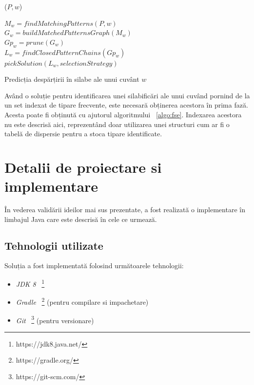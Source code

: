 \begin{algorithm}
\SetAlgoLined
{}

\ppg($P, w$) \\

$M_w = findMatchingPatterns(P,w)$ \\
$G_w = buildMatchedPatternsGraph(M_w)$ \\
$Gp_w = prune(G_w)$ \\
$L_w = findClosedPatternChains(Gp_w)$ \\
\KwRet $pickSolution(L_w, selectionStrategy)$
\vspace{1cm}

\caption{Predicția despărțirii în silabe ale unui cuvânt $w$}
\label{algo:rosil}
\end{algorithm}

Având o soluție pentru identificarea unei silabificări ale unui cuvând pornind de la un set indexat de tipare frecvente, este necesară obținerea acestora în prima fază. Acesta poate fi obținută cu ajutorul algoritmului ~\ref{algo:fse}. Indexarea acestora nu este descrisă aici, reprezentând doar utilizarea unei structuri cum ar fi o tabelă de dispersie pentru a stoca tipare identificate. 

\chapter{Detalii de proiectare si implementare}

În vederea validării ideilor mai sus prezentate, a fost realizată o implementare în limbajul Java care este descrisă în cele ce urmează.

\section{Tehnologii utilizate}

Soluția a fost implementată folosind următoarele tehnologii:

\begin{itemize}
	\item \textit{JDK 8} ~\footnote{https://jdk8.java.net/}
	\item \textit{Gradle} ~\footnote{https://gradle.org/} (pentru compilare si impachetare)
	\item \textit{Git} ~\footnote{https://git-scm.com/} (pentru versionare)
\end{itemize}

